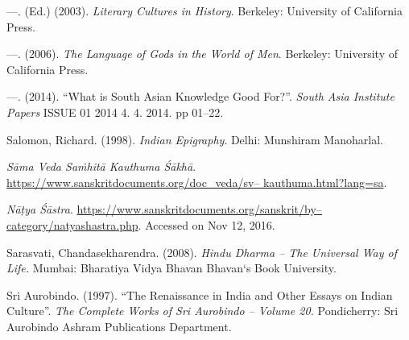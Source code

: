 \begin{thebibliography}{99}
  —. (Ed.) (2003). \textit{Literary Cultures in History}. Berkeley: University of California Press.

  —. (2006). \textit{The Language of Gods in the World of Men}. Berkeley: University of California Press.

  —. (2014). “What is South Asian Knowledge Good For?”. \textit{South Asia Institute Papers} ISSUE 01 2014 4. 4. 2014. pp 01–22.

  Salomon, Richard. (1998). \textit{Indian Epigraphy}. Delhi: Munshiram Manoharlal.

  \textit{Sāma Veda Saṁhitā Kauthuma Śākhā}. \url{https://www.sanskritdocuments.org/doc_veda/sv– kauthuma.html?lang=sa}.

  \textit{Nāṭya Śāstra}. \url{https://www.sanskritdocuments.org/sanskrit/by–category/natyashastra.php}. Accessed on Nov 12, 2016.

  Sarasvati, Chandasekharendra. (2008). \textit{Hindu Dharma – The Universal Way of Life.} Mumbai: Bharatiya Vidya Bhavan Bhavan‘s Book University.

  Sri Aurobindo. (1997). “The Renaissance in India and Other Essays on Indian Culture”. \textit{The Complete Works of Sri Aurobindo – Volume 20.} Pondicherry: Sri Aurobindo Ashram Publications Department.

 \end{thebibliography}

